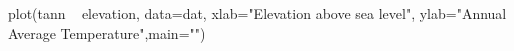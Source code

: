 \begin{Schunk}
\begin{Sinput}
 plot(tann ~ elevation, data=dat, xlab="Elevation above sea level", ylab="Annual Average Temperature",main="")
\end{Sinput}
\end{Schunk}
